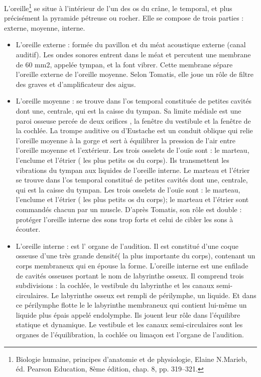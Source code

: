 L'oreille\footnote{Biologie humaine, principes d'anatomie et de physiologie, Elaine N.Marieb, éd. Pearson Education, 8ème édition, chap. 8, pp. 319--321.}  se situe à l'intérieur de l'un des os du crâne, le temporal, et plus précisément la pyramide pétreuse ou rocher. Elle se compose de trois parties : externe, moyenne, interne.
\begin{itemize}
	\item  L'oreille externe : formée du pavillon et du méat acoustique externe
(canal auditif). Les ondes sonores entrent dans le méat et percutent
une membrane de 60 mm2, appelée tympan, et la font vibrer. Cette membrane
sépare l'oreille externe de l'oreille moyenne. 
Selon Tomatis, elle
joue un rôle de filtre des graves et d'amplificateur des aigus.
	\item 
	L'oreille moyenne :
se trouve dans l'os temporal constituée de petites cavités dont une, centrale, qui est la caisse du tympan. Sa limite
médiale est une paroi osseuse percée de deux orifices , la fenêtre
du vestibule et la fenêtre de la cochlée. La trompe auditive ou d'Eustache
est un conduit oblique qui relie l'oreille moyenne à la gorge et sert
à équilibrer la pression de l'air entre l'oreille moyenne et l'extérieur.
Les trois osselets de l'ouïe sont : le marteau, l'enclume et l'étrier
( les plus petits os du corps). Ils transmettent les vibrations du
tympan aux liquides de l'oreille interne. Le marteau et l'étrier se
trouve dans l'os temporal constitué de petites cavités dont une,
centrale, qui est la caisse du tympan. Les trois osselets de l'ouïe
sont : le marteau, l'enclume et l'étrier ( les plus petits os du corps);
le marteau et l'étrier sont commandés chacun par un muscle. D'après
Tomatis, son rôle est double : protéger l'oreille interne des sons
trop forts et celui de cibler les sons à écouter.
\item L'oreille interne
: est l' organe de l\textquoteright audition. Il
est constitué d'une coque osseuse d'une très grande densité( la plus
importante du corps), contenant un corps membraneux qui en épouse
la forme. L'oreille interne est une enfilade de cavités osseuses portant
le nom de labyrinthe osseux. Il comprend trois subdivisions : la cochlée,
le vestibule du labyrinthe et les canaux semi-circulaires. Le labyrinthe
osseux est rempli de périlymphe, un liquide. Et dans ce périlymphe
flotte le le labyrinthe membraneux qui contient lui-même un liquide
plus épais appelé endolymphe. Ils jouent leur rôle dans l'équilibre
statique et dynamique. Le vestibule et les canaux semi-circulaires
sont les organes de l\textquoteright équilibration, la cochlée ou
limaçon est l'organe de l'audition. 
\end{itemize}


